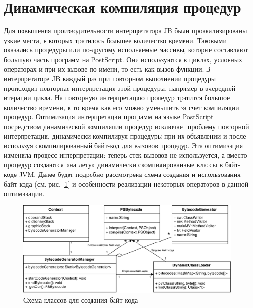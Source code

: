 	\section{Динамическая компиляция процедур}
	Для повышения производительности интерпретатора JB были проанализированы узкие места, в которых тратилось большее количество времени. Таковыми оказались процедуры или по-другому исполняемые массивы, которые составляют большую часть программ на PostScript. Они используются в циклах, условных операторах и при их вызове по имени, то есть как вызов функции.  
	В интерпретаторе JB каждый раз при повторном выполнении процедуры происходит повторная интерпретация этой процедуры, например в очередной итерации цикла. На повторную интерпретацию процедур тратится большое количество времени, в то время как его можно уменьшить за счет компиляции процедур.
	Оптимизация интерпретации программ на языке PostScript посредством динамической компиляции процедур исключает проблему повторной интерпретации, динамически компилируя процедуры при их объявлении и после используя скомпилированный байт-код для вызовов процедур.  	
	Эта оптимизация изменила процесс интерпретации: теперь стек вызовов не используется, а вместо процедур создаются «на лету» динамически скомпилированные классы в байт-коде JVM. Далее будет подробно рассмотрена схема создания и использования байт-кода (см. рис.~\ref{scheme}) и особенности реализации некоторых операторов в данной оптимизации.
	
	\begin{figure} [h]
		\includegraphics[width=\linewidth]{Pozdin/bytecode_generation.png}
		\caption{Схема классов для создания байт-кода}\label{scheme}
	\end{figure}
